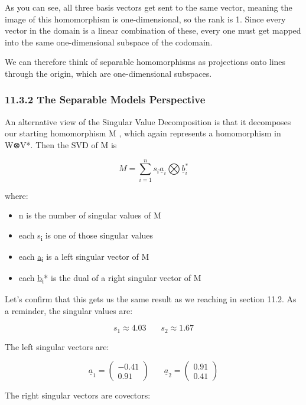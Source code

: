 \documentclass[oneside,english]{amsbook}
\numberwithin{section}{chapter}
\theoremstyle{plain}
\theoremstyle{definition}
\begin{document}
As you can see, all three basis vectors get sent to the same vector,
meaning the image of this homomorphism is one-dimensional, so the rank
is 1. Since every vector in the domain is a linear combination of these,
every one must get mapped into the same one-dimensional subspace of the
codomain.

We can therefore think of separable homomorphisms as projections onto
lines through the origin, which are one-dimensional subspaces.

\subsubsection{11.3.2 The Separable Models
	Perspective}\label{the-separable-models-perspective}

An alternative view of the Singular Value Decomposition is that it
decomposes our starting homomorphism M , which again represents a
homomorphism in W⊗V*. Then the SVD of M is

\[M = \sum_{i = 1}^{n}{s_{i}{\underline{a}}_{i}\bigotimes{\underline{b}}_{i}^{*}}\]

where:

\begin{itemize}
	\item
	n is the number of singular values of M
	\item
	each s\textsubscript{i} is one of those singular values
	\item
	each \ul{a}\textsubscript{i} is a left singular vector of M
	\item
	each \ul{b}\textsubscript{i}* is the dual of a right singular vector
	of M
\end{itemize}

Let's confirm that this gets us the same result as we reaching in
section 11.2. As a reminder, the singular values are:

\[s_{1} \approx 4.03\ \ \ \ \ \ \ \ s_{2} \approx 1.67\]

The left singular vectors are:

\[{\underline{a}}_{1} = \begin{pmatrix}
	- 0.41 \\
	0.91
\end{pmatrix}\ \ \ \ \ \ \ \ {\underline{a}}_{2} = \begin{pmatrix}
	0.91 \\
	0.41
\end{pmatrix}\]

The right singular vectors are covectors:
\end{document}

